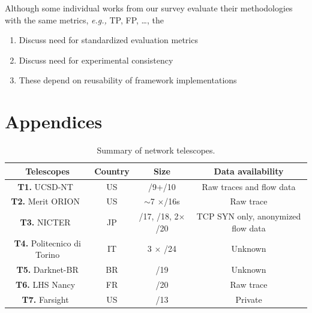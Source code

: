 \documentclass[manuscript,nonacm]{acmart}
\begin{document}

Although some individual works from our survey evaluate their methodologies with the same metrics, \textit{e.g.,} TP, FP, \dots, 
the

\begin{enumerate}
	\item Discuss need for standardized evaluation metrics
	\item Discuss need for experimental consistency
	\item These depend on reusability of framework implementations
\end{enumerate}


\section{Appendices}

\begin{table}[httb]
	\small
	\caption{Summary of network telescopes.}\label{tab:telescopes}
	\begin{tabular}{cccc}
		\toprule
		Telescopes & Country & Size & Data availability\\
		\midrule
		\textbf{T1.} UCSD-NT~\cite{caida2025ucsdnt} & US & /9+/10 & Raw traces and flow data \\
		\textbf{T2.} Merit ORION~\cite{orion} & US & $\sim$7 $\times$/16s & Raw trace\\
		\textbf{T3.} NICTER~\cite{nicter2025nt} & JP &  /17, /18, 2$\times$/20 & TCP SYN only, anonymized flow data\\
		\textbf{T4.} Politecnico di Torino \cite{2020soro} & IT & 3 $\times$ /24 & Unknown\\
		\textbf{T5.} Darknet-BR \cite{CunhaCamargo2025darknetbr} & BR & /19 & Unknown\\
		\textbf{T6.} LHS Nancy~\cite{inria2025nt} & FR & /20 & Raw trace\\
		\textbf{T7.} Farsight~\cite{@@} & US & /13 & Private\\
		\bottomrule
	\end{tabular}
\end{table}
\end{document}
